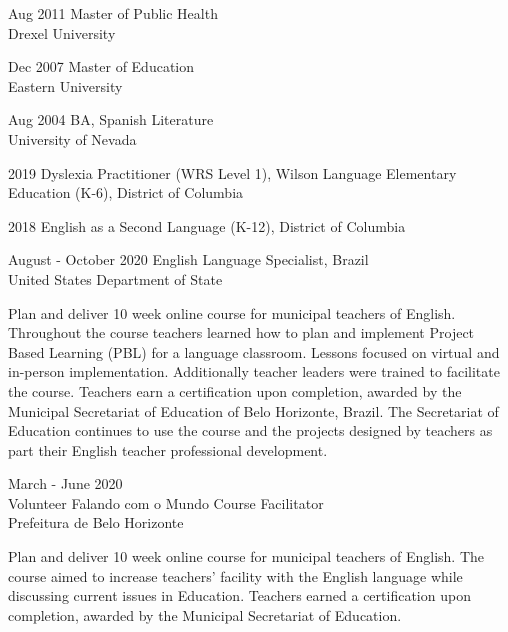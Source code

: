 \documentclass[]{scrartcl}
\begin{document}
\begin{cleanCV}
  \vspace{-0.50em}
  
\WorkExperience
{Aug 2011}
{Master of Public Health}
{\\Drexel University}

\WorkExperience
{Dec 2007}
{Master of Education}
{\\Eastern University}

\WorkExperience
{Aug 2004}
{BA, Spanish Literature}
{\\University of Nevada}

\vspace{-1.0em}


\WorkExperience
{2019}
{}
{Dyslexia Practitioner (WRS Level 1), Wilson Language Elementary \\
 Education (K-6), District of Columbia}

\WorkExperience
{2018}
{}{English as a Second Language (K-12), District of Columbia}
\vspace{-1.0em}
    
\vspace{0.50em}

\WorkExperience
{August - October 2020}
{English Language Specialist, Brazil\\}
{United States Department of State}

\JobDesc{}
{Plan and deliver 10 week online course for municipal teachers of English. Throughout the course teachers learned how to plan and implement Project Based Learning (PBL) for a language classroom. Lessons focused on virtual and in-person implementation. Additionally teacher leaders were trained to facilitate the course. Teachers earn a certification upon completion, awarded by the Municipal Secretariat of Education of Belo Horizonte, Brazil. The Secretariat of Education continues to use the course and the projects designed by teachers as part their English teacher professional development.}


\WorkExperience
{March - June 2020 \\ Volunteer}
{Falando com o Mundo Course Facilitator}
{\\Prefeitura de Belo Horizonte}

\JobDesc{}
{Plan and deliver 10 week online course for municipal teachers of English. The course aimed to increase teachers' facility with the English language while discussing current issues in Education. Teachers earned a certification upon completion, awarded by the Municipal Secretariat of Education.}


\end{cleanCV}
\end{document}
